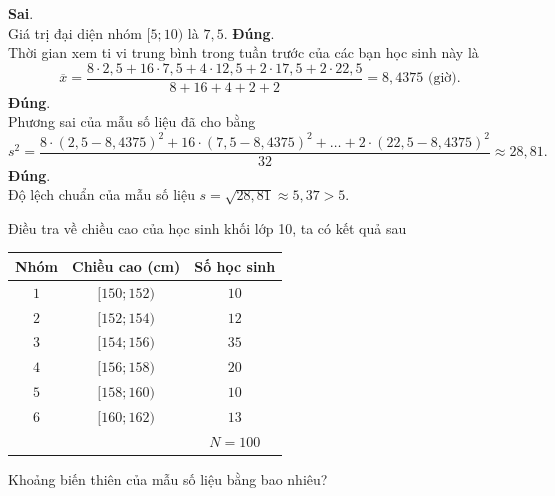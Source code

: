 \begin{ex}
{\begin{center}
\begin{tabular}{|c|c|c|c|c|c|}
\hline
\end{tabular}
\end{center}
\begin{itemchoice}
\itemch \textbf{Sai}.\\
Giá trị đại diện nhóm $[5;10)$ là $7{,}5$.
\itemch \textbf{Đúng}.\\
Thời gian xem ti vi trung bình trong tuần trước của các bạn học sinh này là
\[\overline{x}=\dfrac{8\cdot 2{,}5+16\cdot 7{,}5+4\cdot 12{,}5+2\cdot 17{,}5+2\cdot 22{,}5}{8+16+4+2+2}=8{,}4375\,\,\text{(giờ)}.\]
\itemch \textbf{Đúng}.\\
Phương sai của mẫu số liệu đã cho bằng
\[s^2=\dfrac{8\cdot(2{,}5-8{,}4375)^2+16\cdot(7{,}5-8{,}4375)^2+\ldots +2\cdot (22{,}5-8{,}4375)^2}{32}\approx 28{,}81.\]
\itemch \textbf{Đúng}.\\
Độ lệch chuẩn của mẫu số liệu $s=\sqrt{28{,}81}\approx 5{,}37>5$.
\end{itemchoice}
}
\end{ex}

\begin{bt}%
Điều tra về chiều cao của học sinh khối lớp 10, ta có kết quả sau
\begin{center}
\begin{tabular}{|c|c|c|}
\hline
\textbf{Nhóm} & \textbf{Chiều cao (cm)} & \textbf{Số học sinh} \\
\hline
$1$ & $[150;152)$ & $10$ \\
\hline
$2$ & $[152;154)$ & $12$ \\
\hline
$3$ & $[154;156)$ & $35$ \\
\hline
$4$ & $[156;158)$ & $20$ \\
\hline
$5$ & $[158;160)$ & $10$ \\
\hline
$6$ & $[160;162)$ & $13$ \\
\hline
&  & $N=100$ \\
\hline
\end{tabular}
\end{center}
Khoảng biến thiên của mẫu số liệu bằng bao nhiêu?
\end{bt}

